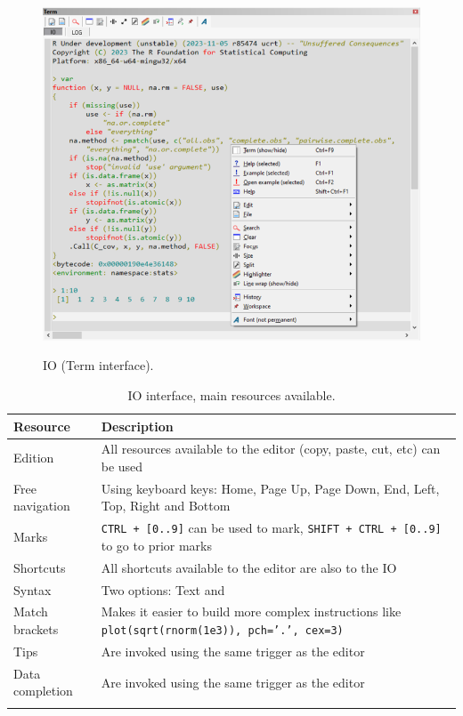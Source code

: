 \begin{figure}[H]
  \includegraphics[width=\headwidth]{./res/term_io.png}\\
  \caption{IO (Term interface).}
  \label{fig:term_io}
\end{figure}

\begin{table}
  \begin{footnotesize}
    \begin{tabularx}{\textwidth}{>{\hsize=0.3\hsize}X>{\hsize=0.7\hsize}X}\\
      \hline
      \textbf{Resource} & \textbf{Description} \\
      \hline
      Edition & All resources available to the editor (copy, paste, cut, etc) can be used \\
      Free navigation & Using keyboard keys: Home, Page Up, Page Down, End, Left, Top, Right and Bottom \\
      Marks & \texttt{CTRL + [0..9]} can be used to mark, \texttt{SHIFT + CTRL + [0..9]} to go to prior marks \\
      Shortcuts & All shortcuts available to the editor are also to the IO \\
      Syntax & Two options: Text and \RR{} \\
      Match brackets & Makes it easier to build more complex instructions like \texttt{plot(sqrt(rnorm(1e3)), pch='.', cex=3)} \\
      Tips & Are invoked using the same trigger as the editor \\
      Data completion & Are invoked using the same trigger as the editor \\
      \hline
      \\
    \end{tabularx}
  \end{footnotesize}
  \caption{IO interface, main resources available.}
  \label{tab:io_interface}
\end{table}


